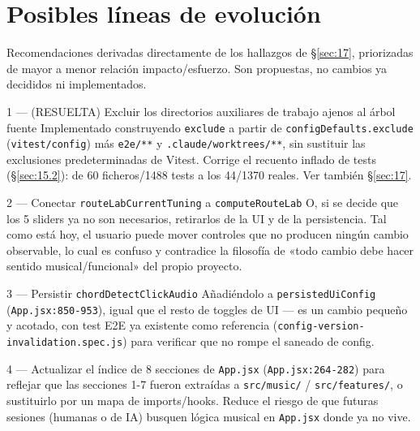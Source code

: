 \documentclass[a4paper,11pt,oneside]{report}
\newcommand{\Sref}[1]{\S\ref{#1}}
\begin{document}
\chapter{Posibles líneas de evolución}
\label{sec:18}

Recomendaciones derivadas directamente de los hallazgos de \Sref{sec:17}, priorizadas de mayor a menor relación impacto/esfuerzo. Son propuestas, no cambios ya decididos ni implementados.

\begin{recobox}{1 --- (RESUELTA) Excluir los directorios auxiliares de trabajo ajenos al árbol fuente}
Implementado construyendo \lstinline!exclude! a partir de \lstinline!configDefaults.exclude! (\lstinline!vitest/config!) más \lstinline!e2e/**! y \lstinline!.claude/worktrees/**!, sin sustituir las exclusiones predeterminadas de Vitest. Corrige el recuento inflado de tests (\Sref{sec:15.2}): de 60 ficheros/1488 tests a los 44/1370 reales. Ver también \Sref{sec:17}.
\end{recobox}

\begin{recobox}{2 --- Conectar \texttt{routeLabCurrentTuning} a \texttt{computeRouteLab}}
O, si se decide que los 5 sliders ya no son necesarios, retirarlos de la UI y de la persistencia. Tal como está hoy, el usuario puede mover controles que no producen ningún cambio observable, lo cual es confuso y contradice la filosofía de «todo cambio debe hacer sentido musical/funcional» del propio proyecto.
\end{recobox}

\begin{recobox}{3 --- Persistir \texttt{chordDetectClickAudio}}
Añadiéndolo a \lstinline!persistedUiConfig! (\lstinline!App.jsx:850-953!), igual que el resto de toggles de UI --- es un cambio pequeño y acotado, con test E2E ya existente como referencia (\lstinline!config-version-invalidation.spec.js!) para verificar que no rompe el saneado de config.
\end{recobox}

\begin{recobox}{4 --- Actualizar el índice de 8 secciones de \texttt{App.jsx}}
(\lstinline!App.jsx:264-282!) para reflejar que las secciones 1-7 fueron extraídas a \lstinline!src/music/! / \lstinline!src/features/!, o sustituirlo por un mapa de imports/hooks. Reduce el riesgo de que futuras sesiones (humanas o de IA) busquen lógica musical en \lstinline!App.jsx! donde ya no vive.
\end{recobox}
\end{document}
